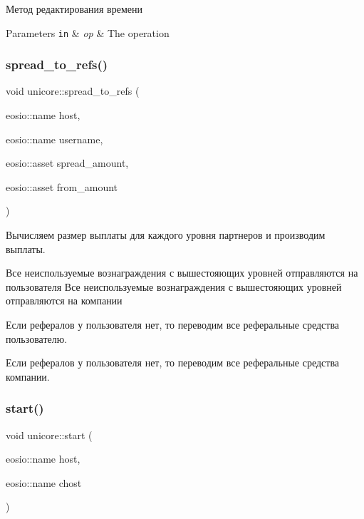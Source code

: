 Метод редактирования времени 


\begin{DoxyParams}[1]{Parameters}
\mbox{\tt in}  & {\em op} & The operation \\
\hline
\end{DoxyParams}
\mbox{\label{classunicore_a0c2b0c3fffe564405122f21621aedb78}} 
\subsubsection{\texorpdfstring{spread\+\_\+to\+\_\+refs()}{spread\_to\_refs()}}
{\footnotesize\ttfamily void unicore\+::spread\+\_\+to\+\_\+refs (\begin{DoxyParamCaption}\item[{eosio\+::name}]{host,  }\item[{eosio\+::name}]{username,  }\item[{eosio\+::asset}]{spread\+\_\+amount,  }\item[{eosio\+::asset}]{from\+\_\+amount }\end{DoxyParamCaption})\hspace{0.3cm}{\ttfamily [static]}}

Вычисляем размер выплаты для каждого уровня партнеров и производим выплаты.

Все неиспользуемые вознаграждения с вышестояющих уровней отправляются на пользователя Все неиспользуемые вознаграждения с вышестояющих уровней отправляются на компании

Если рефералов у пользователя нет, то переводим все реферальные средства пользователю.
\begin{DoxyItemize}
\item Если рефералов у пользователя нет, то переводим все реферальные средства компании.
\end{DoxyItemize}\mbox{\label{classunicore_ad83b75f3c4afd1ab954d428be8f6f7d7}} 
\subsubsection{\texorpdfstring{start()}{start()}}
{\footnotesize\ttfamily void unicore\+::start (\begin{DoxyParamCaption}\item[{eosio\+::name}]{host,  }\item[{eosio\+::name}]{chost }\end{DoxyParamCaption})}



